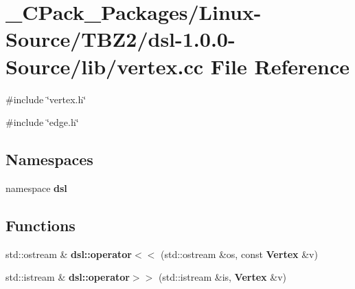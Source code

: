 \section{\_\-CPack\_\-Packages/Linux-\/Source/TBZ2/dsl-\/1.0.0-\/Source/lib/vertex.cc File Reference}
\label{__CPack__Packages_2Linux-Source_2TBZ2_2dsl-1_80_80-Source_2lib_2vertex_8cc}
{\ttfamily \#include \char`\"{}vertex.h\char`\"{}}\par
{\ttfamily \#include \char`\"{}edge.h\char`\"{}}\par
\subsection*{Namespaces}
\begin{DoxyCompactItemize}
\item 
namespace {\bf dsl}
\end{DoxyCompactItemize}
\subsection*{Functions}
\begin{DoxyCompactItemize}
\item 
std::ostream \& {\bf dsl::operator$<$$<$} (std::ostream \&os, const {\bf Vertex} \&v)
\item 
std::istream \& {\bf dsl::operator$>$$>$} (std::istream \&is, {\bf Vertex} \&v)
\end{DoxyCompactItemize}

